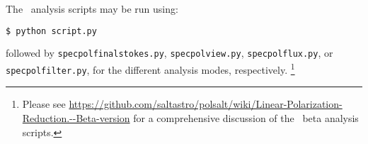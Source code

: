 The \polsalt\ analysis scripts may be run using:
\begin{lstlisting}[language=bash]
$ python script.py
\end{lstlisting}
{\parskip=0pt followed} by \texttt{specpolfinalstokes.py}, \texttt{specpolview.py}, \texttt{specpolflux.py}, or \texttt{specpol\-filter.py}, for the different analysis modes, respectively.%
\footnote{Please see \url{https://github.com/saltastro/polsalt/wiki/Linear-Polarization-Reduction.--Beta-version} for a comprehensive discussion of the \polsalt\ beta analysis scripts.}
